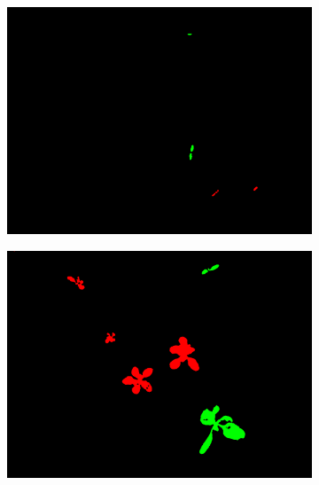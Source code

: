 \documentclass[letterpaper, 10 pt, conference]{ieeeconf}  %
\begin{document}
\begin{figure}
           \begin{subfigure}[b]{0.31\linewidth}
    \includegraphics[width=\linewidth]{pics/bonn/annotations/bonirob_2016-04-28-12-20-29_6_frame217.png}
   		\caption{}
		\label{bonn_lbl}    		
   \end{subfigure}
        \begin{subfigure}[b]{0.31\linewidth}
    \includegraphics[width=\linewidth]{pics/stuttgart/annotations/masks_8mm_fromImages_frame479_GroundTruth_iMap.png}
   		\caption{}
		\label{stuttgart_lbl}    		
   \end{subfigure}
        \begin{subfigure}[b]{0.31\linewidth}

\end{subfigure}
\end{figure}
\end{document}
